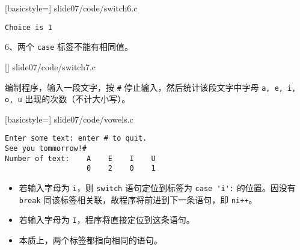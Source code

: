 \begin{frame}[fragile]\ft{\secname}

[basicstyle=\ttfamily\small]
{slide07/code/switch6.c} \pause 

\begin{lstlisting}[backgroundcolor=\color{blue!20}]
Choice is 1
\end{lstlisting}
\end{frame}

\begin{frame}\ft{\secname}
6、两个 \lstinline|case| 标签不能有相同值。
\end{frame}

\begin{frame}\ft{\secname}

[]
{slide07/code/switch7.c}
\end{frame}



\begin{frame}[fragile]\ft{\secname}
  \begin{free}[例]{}
    编制程序，输入一段文字，按 \lstinline|#| 停止输入，然后统计该段文字中字母 \lstinline|a, e, i, o, u| 出现的次数（不计大小写）。
  \end{free}
\end{frame}

\begin{frame}\ft{\secname}

[basicstyle=\ttfamily\small]
{slide07/code/vowels.c}
\end{frame}

\begin{frame}[fragile]\ft{\secname}
\begin{lstlisting}[backgroundcolor=\color{red!10}]
Enter some text: enter # to quit.
See you tommorrow!#
Number of text:    A    E    I    U
                   0    2    0    1
\end{lstlisting}   
\end{frame}

\begin{frame}[fragile]\ft{\secname}
\begin{itemize}
\item
若输入字母为 \lstinline|i|，则 \lstinline|switch| 语句定位到标签为 \lstinline|case 'i':| 的位置。因没有 \lstinline|break| 同该标签相关联，故程序将前进到下一条语句，即 \lstinline|ni++|。\\[0.1in]
\item 
若输入字母为 \lstinline|I|，程序将直接定位到这条语句。\\[0.1in]
\item 
本质上，两个标签都指向相同的语句。
\end{itemize} 
\end{frame}

